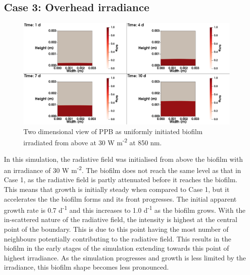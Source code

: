 \subsection{Case 3: Overhead irradiance}
\begin{figure}[H]
    \centering
     \hspace*{-1cm}\includegraphics[width=1.1\textwidth,height=0.4\textheight]{Chap4/methods/data/figures/case4_ppb_frac.png}
    \caption{Two dimensional view of PPB as uniformly initiated biofilm irradiated from above at 30 W m\textsuperscript{-2} at 850 nm.} 
    \label{fig:case4_ppb_frac}
\end{figure}

In this simulation, the radiative field was initialised from above the biofilm with an irradiance of 30 W m\textsuperscript{-2}. The biofilm does not reach the same level as that in Case 1, as the radiative field is partly attenuated before it reaches the biofilm. This means that growth is initially steady when compared to Case 1, but it accelerates the the biofilm forms and its front progresses. The initial apparent growth rate is 0.7 d\textsuperscript{-1} and this increases to 1.0 d\textsuperscript{-1} as the biofilm grows. With the in-scattered nature of the radiative field, the intensity is highest at the central point of the boundary. This is due to this point having the most number of neighbours potentially contributing to the radiative field. This results in the biofilm in the early stages of the simulation extending towards this point of highest irradiance. As the simulation progresses and growth is less limited by the irradiance, this biofilm shape becomes less pronounced.

